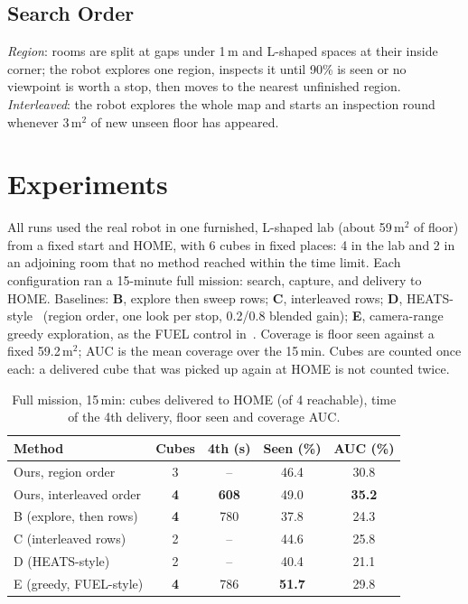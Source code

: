 \documentclass[conference,a4paper,10pt]{IEEEtran}
\begin{document}
\subsection{Search Order}
\emph{Region}: rooms are split at gaps under 1\,m and L-shaped spaces at their
inside corner; the robot explores one region, inspects it until 90\% is seen or
no viewpoint is worth a stop, then moves to the nearest unfinished region.
\emph{Interleaved}: the robot explores the whole map and starts an inspection
round whenever 3\,m\(^2\) of new unseen floor has appeared.

\section{Experiments}
All runs used the real robot in one furnished, L-shaped lab (about 59\,m\(^2\) of
floor) from a fixed start and HOME, with 6 cubes in fixed places: 4 in the lab
and 2 in an adjoining room that no method reached within the time limit. Each
configuration ran a 15-minute full mission: search, capture, and delivery to
HOME. Baselines:
\textbf{B}, explore then sweep rows;
\textbf{C}, interleaved rows;
\textbf{D}, HEATS-style~\cite{heats} (region order, one look per stop,
0.2/0.8 blended gain);
\textbf{E}, camera-range greedy exploration, as the FUEL control
in~\cite{starsearcher}. Coverage is floor seen against a fixed 59.2\,m\(^2\); AUC
is the mean coverage over the 15\,min. Cubes are counted once each: a delivered
cube that was picked up again at HOME is not counted twice.

\begin{table}[t]
\caption{Full mission, 15\,min: cubes delivered to HOME (of 4 reachable),
time of the 4th delivery, floor seen and coverage AUC.}
\label{tab:bench}
\centering
\setlength{\tabcolsep}{3pt}
\begin{tabular}{lcccc}
\toprule
\textbf{Method} & \textbf{Cubes} & \textbf{4th (s)} &
\textbf{Seen (\%)} & \textbf{AUC (\%)} \\
\midrule
Ours, region order      & 3 & --  & 46.4 & 30.8 \\
Ours, interleaved order & \textbf{4} & \textbf{608} & 49.0 & \textbf{35.2} \\
B (explore, then rows)  & \textbf{4} & 780 & 37.8 & 24.3 \\
C (interleaved rows)    & 2 & --  & 44.6 & 25.8 \\
D (HEATS-style)         & 2 & --  & 40.4 & 21.1 \\
E (greedy, FUEL-style)  & \textbf{4} & 786 & \textbf{51.7} & 29.8 \\
\bottomrule
\end{tabular}
\end{table}
\end{document}
